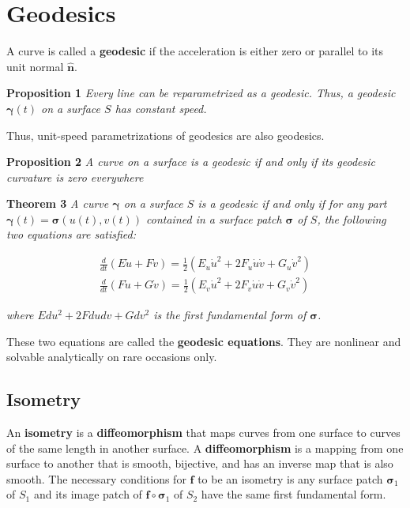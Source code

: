 \documentclass[11pt]{article}
\begin{document}
\section{Geodesics}
\label{sec:org054135a}
A curve is called a \textbf{geodesic} if the acceleration is either zero or parallel to its unit normal \(\hat{\boldsymbol{n}}\).

\textbf{Proposition 1} \emph{Every line can be reparametrized as a geodesic. Thus, a geodesic \(\boldsymbol{\gamma}\left(t\right)\) on a surface \(S\) has constant speed.}

Thus, unit-speed parametrizations of geodesics are also geodesics.

\textbf{Proposition 2} \emph{A curve on a surface is a geodesic if and only if its geodesic curvature is zero everywhere}

\textbf{Theorem 3} \emph{A curve \(\boldsymbol{\gamma}\) on a surface \(S\) is a geodesic if and only if for any part \(\boldsymbol{\gamma}\left(t\right) = \boldsymbol{\sigma}\left(u\left(t\right),v\left(t\right)\right)\) contained in a surface patch \(\boldsymbol{\sigma}\) of \(S\), the following two equations are satisfied:}

\begin{align*}
    \frac{d}{dt}\left(E\dot{u} + F\dot{v}\right) = \frac{1}{2}\left(E_{u}\dot{u}^{2} + 2F_{u}\dot{u}\dot{v} + G_{u}\dot{v}^{2}\right) \\
    \frac{d}{dt}\left(F\dot{u} + G\dot{v}\right) = \frac{1}{2}\left(E_{v}\dot{u}^{2} + 2F_{v}\dot{u}\dot{v} + G_{v}\dot{v}^{2}\right)
\end{align*}

\emph{where \(Edu^{2} + 2Fdudv + Gdv^{2}\) is the first fundamental form of \(\boldsymbol{\sigma}\).}

These two equations are called the \textbf{geodesic equations}. They are nonlinear and solvable analytically on rare occasions only.

\subsection{Isometry}
\label{sec:orgfd9c50c}
An \textbf{isometry} is a \textbf{diffeomorphism} that maps curves from one surface to curves of the same length in another surface. A \textbf{diffeomorphism} is a mapping from one surface to another that is smooth, bijective, and has an inverse map that is also smooth. The necessary conditions for \(\boldsymbol{f}\) to be an isometry is any surface patch \(\boldsymbol{\sigma}_{1}\) of \(S_{1}\) and its image patch of \(\boldsymbol{f} \circ \boldsymbol{\sigma}_{1}\) of \(S_{2}\) have the same first fundamental form.
\end{document}
